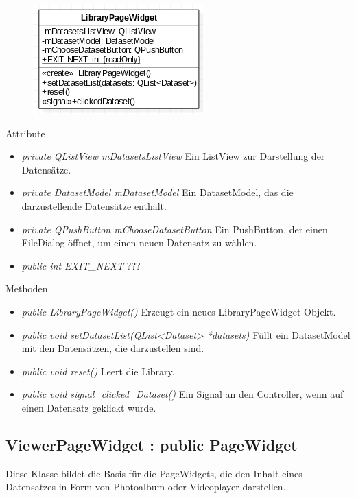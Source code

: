 \begin{figure}[H]
	\centering
	\includegraphics[scale=0.5]{img/Klassendiagramm/Klassen/View/LibraryPageWidget}
	\label{fig:libraryPageWidget}
\end{figure}

Attribute
\begin{itemize}
	\item\textit{private QListView mDatasetsListView} 
	Ein ListView zur Darstellung der Datensätze.
	\item\textit{private DatasetModel mDatasetModel}
	Ein DatasetModel, das die darzustellende Datensätze enthält.
	\item\textit{private QPushButton mChooseDatasetButton} 
	Ein PushButton, der einen FileDialog öffnet, um einen neuen Datensatz zu wählen.
	\item\textit{public int EXIT\_NEXT}
	???     
\end{itemize}

Methoden
\begin{itemize}
	\item\textit{public LibraryPageWidget()} 
	Erzeugt ein neues LibraryPageWidget Objekt.
	\item\textit{public void setDatasetList(QList<Dataset> *datasets)} 
	Füllt ein DatasetModel mit den Datensätzen, die darzustellen sind.
	\item\textit{public void reset()} 
	Leert die Library.
	\item\textit{public void signal\_clicked\_Dataset()} 
	Ein Signal an den Controller, wenn auf einen Datensatz geklickt wurde.
\end{itemize}

\subsection*{ViewerPageWidget : public PageWidget}
Diese Klasse bildet die Basis für die PageWidgets, die den Inhalt eines Datensatzes in Form von Photoalbum oder Videoplayer darstellen.

